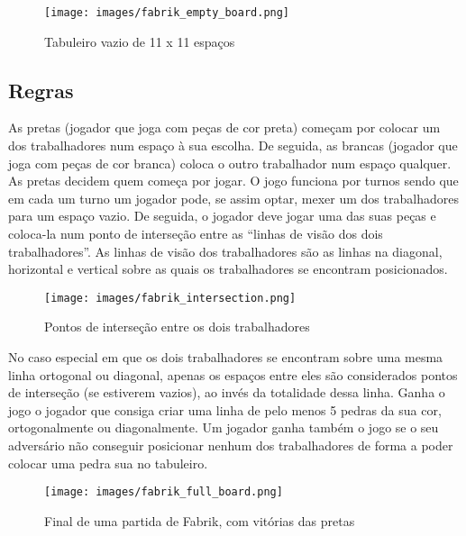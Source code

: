\documentclass[a4paper]{article}
\begin{document}
\begin{figure}[h!]
\begin{center}
\texttt{[image: images/fabrik\_empty\_board.png]}
\caption{Tabuleiro vazio de 11 x 11 espaços}
\label{Figura 1}
\end{center}
\end{figure}

\subsection{Regras}
As pretas (jogador que joga com peças de cor preta) começam por colocar um dos trabalhadores num espaço à sua escolha. De seguida, as brancas (jogador que joga com peças de cor branca) coloca o outro trabalhador num espaço qualquer. As pretas decidem quem começa por jogar.
O jogo funciona por turnos sendo que em cada um turno um jogador pode, se assim optar, mexer um dos trabalhadores para um espaço vazio. De seguida, o jogador deve jogar uma das suas  peças e coloca-la num ponto de interseção entre as “linhas de visão dos dois trabalhadores”. As linhas de visão dos trabalhadores são as linhas na diagonal, horizontal e vertical sobre as quais os trabalhadores se encontram posicionados.

\begin{figure}[h!]
\begin{center}
\texttt{[image: images/fabrik\_intersection.png]}
\caption{Pontos de interseção entre os dois trabalhadores}
\label{Figura 2}
\end{center}
\end{figure}

No caso especial em que os dois trabalhadores se encontram sobre uma mesma linha ortogonal ou diagonal, apenas os espaços entre eles são considerados pontos de interseção (se estiverem vazios), ao invés da totalidade dessa linha.
Ganha o jogo o jogador que consiga criar uma linha de pelo menos 5 pedras da sua cor, ortogonalmente ou diagonalmente. Um jogador ganha também o jogo se o seu adversário não conseguir posicionar nenhum dos trabalhadores de forma a poder colocar uma pedra sua no tabuleiro.

\begin{figure}[h!]
\begin{center}
\texttt{[image: images/fabrik\_full\_board.png]}
\caption{Final de uma partida de Fabrik, com vitórias das pretas}
\label{Figura 3}
\end{center}
\end{figure}
\end{document}
